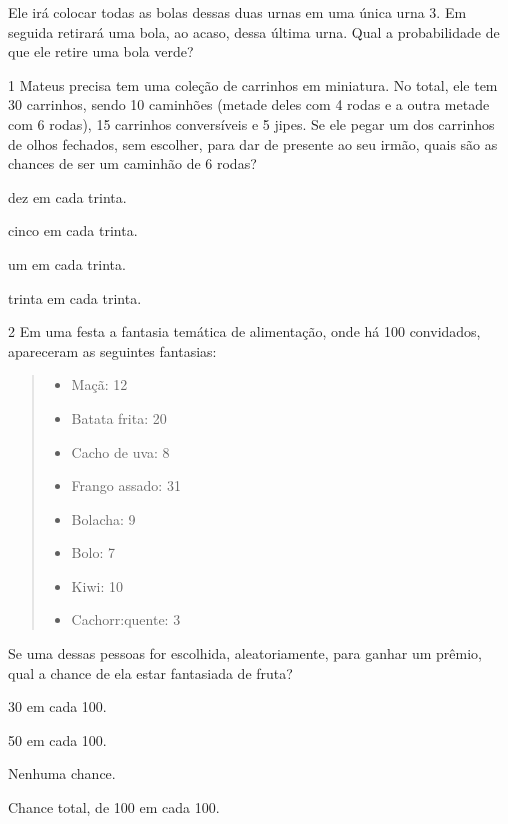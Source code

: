 Ele irá colocar todas as bolas dessas duas urnas em uma única urna 3. Em
seguida retirará uma bola, ao acaso, dessa última urna. Qual a
probabilidade de que ele retire uma bola verde?






\num{1} Mateus precisa tem uma coleção de carrinhos em miniatura. No total, ele tem 30 carrinhos, sendo 10 caminhões (metade deles com 4 rodas e a outra metade com 6 rodas), 15 carrinhos conversíveis e 5 jipes. Se ele pegar um dos carrinhos de olhos fechados, sem escolher, para dar de presente ao seu irmão, quais são as chances de ser um caminhão de 6 rodas?

\begin{escolha}
\item
  dez em cada trinta.
\item
  cinco em cada trinta.
\item
  um em cada trinta.
\item
  trinta em cada trinta.
\end{escolha}


\num{2} Em uma festa a fantasia temática de alimentação, onde há 100 convidados, apareceram as seguintes fantasias:

\begin{quote}
\begin{itemize}
\item Maçã: 12
\item Batata frita: 20
\item Cacho de uva: 8
\item Frango assado: 31
\item Bolacha: 9
\item Bolo: 7
\item Kiwi: 10
\item Cachorr:quente: 3
\end{itemize}
\end{quote}

Se uma dessas pessoas for escolhida, aleatoriamente, para ganhar um prêmio, qual a chance de ela estar fantasiada de fruta?

\begin{escolha}
\item
30 em cada 100.
\item
50 em cada 100.
\item
Nenhuma chance.
\item
Chance total, de 100 em cada 100.
\end{escolha}


